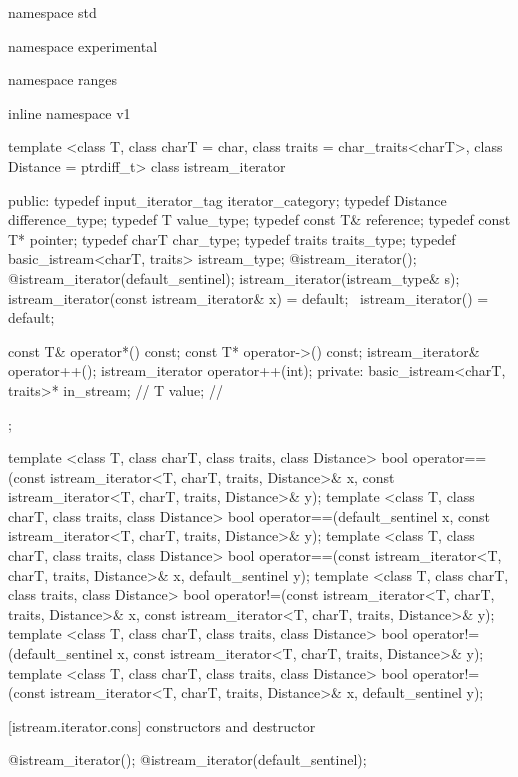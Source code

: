 \begin{codeblock}
namespace std { namespace experimental { namespace ranges { inline namespace v1 {
  template <class T, class charT = char, class traits = char_traits<charT>,
      class Distance = ptrdiff_t>
  class istream_iterator {
  public:
    typedef input_iterator_tag iterator_category;
    typedef Distance difference_type;
    typedef T value_type;
    typedef const T& reference;
    typedef const T* pointer;
    typedef charT char_type;
    typedef traits traits_type;
    typedef basic_istream<charT, traits> istream_type;
    @\seebelow@ istream_iterator();
    @\seebelow@ istream_iterator(default_sentinel);
    istream_iterator(istream_type& s);
    istream_iterator(const istream_iterator& x) = default;
    ~istream_iterator() = default;

    const T& operator*() const;
    const T* operator->() const;
    istream_iterator& operator++();
    istream_iterator  operator++(int);
  private:
    basic_istream<charT, traits>* in_stream; // \expos
    T value;                                 // \expos
  };

  template <class T, class charT, class traits, class Distance>
    bool operator==(const istream_iterator<T, charT, traits, Distance>& x,
            const istream_iterator<T, charT, traits, Distance>& y);
  template <class T, class charT, class traits, class Distance>
    bool operator==(default_sentinel x,
            const istream_iterator<T, charT, traits, Distance>& y);
  template <class T, class charT, class traits, class Distance>
    bool operator==(const istream_iterator<T, charT, traits, Distance>& x,
            default_sentinel y);
  template <class T, class charT, class traits, class Distance>
    bool operator!=(const istream_iterator<T, charT, traits, Distance>& x,
            const istream_iterator<T, charT, traits, Distance>& y);
  template <class T, class charT, class traits, class Distance>
    bool operator!=(default_sentinel x,
            const istream_iterator<T, charT, traits, Distance>& y);
  template <class T, class charT, class traits, class Distance>
    bool operator!=(const istream_iterator<T, charT, traits, Distance>& x,
            default_sentinel y);
}}}}
\end{codeblock}

[istream.iterator.cons]{ constructors and destructor}

%
\begin{itemdecl}
@\seebelow@ istream_iterator();
@\seebelow@ istream_iterator(default_sentinel);
\end{itemdecl}

